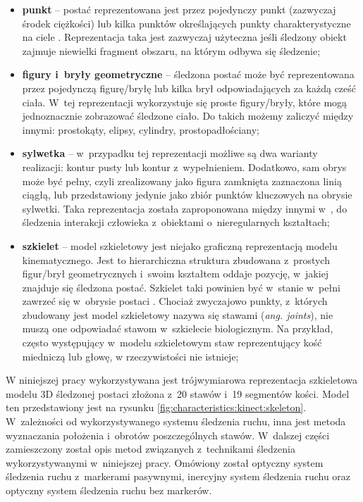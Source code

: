 \begin{itemize}
	\item \textbf{punkt} -- postać reprezentowana jest przez pojedynczy punkt (zazwyczaj środek ciężkości) \cite{Veenman2001} lub kilka punktów określających punkty charakterystyczne na ciele \cite{Serby2004}. Reprezentacja taka jest zazwyczaj użyteczna jeśli śledzony obiekt zajmuje niewielki fragment obszaru, na którym odbywa się śledzenie;
	\item \textbf{figury i~bryły geometryczne} -- śledzona postać może być reprezentowana przez pojedynczą figurę/bryłę \cite{Comaniciu2003} lub kilka brył odpowiadających za każdą cześć ciała. W~tej reprezentacji wykorzystuje się proste figury/bryły, które mogą jednoznacznie zobrazować śledzone ciało. Do takich możemy zaliczyć między innymi: prostokąty, elipsy, cylindry, prostopadłościany;
	\item \textbf{sylwetka} -- w~przypadku tej reprezentacji możliwe są dwa warianty realizacji: kontur pusty lub kontur z~wypełnieniem. Dodatkowo, sam obrys może być pełny, czyli zrealizowany jako figura zamknięta zaznaczona linią ciągłą, lub przedstawiony jedynie jako zbiór punktów kluczowych na obrysie sylwetki. Taka reprezentacja została zaproponowana między innymi w~\cite{Yilmaz2004}, do śledzenia interakcji człowieka z~obiektami o~nieregularnych kształtach;
	\item \textbf{szkielet} -- model szkieletowy jest niejako graficzną reprezentacją modelu kinematycznego. Jest to hierarchiczna struktura zbudowana z~prostych figur/brył geometrycznych i~swoim kształtem oddaje pozycję, w~jakiej znajduje się śledzona postać. Szkielet taki powinien być w~stanie w~pełni zawrzeć się w~obrysie postaci \cite{Ali2001}. Chociaż zwyczajowo punkty, z~których zbudowany jest model szkieletowy nazywa się stawami (\emph{ang. joints}), nie muszą one odpowiadać stawom w~szkielecie biologicznym. Na przykład, często występujący w~modelu szkieletowym staw reprezentujący kość miedniczą lub głowę, w rzeczywistości nie istnieje;
\end{itemize}
															
W niniejszej pracy wykorzystywana jest trójwymiarowa reprezentacja szkieletowa modelu 3D śledzonej postaci złożona z~20 stawów i~19 segmentów kości. Model ten przedstawiony jest na rysunku \ref{fig:characteristics:kinect:skeleton}. W~zależności od wykorzystywanego systemu śledzenia ruchu, inna jest metoda wyznaczania położenia i~obrotów poszczególnych stawów. W~dalszej części zamieszczony został opis metod związanych z~technikami śledzenia wykorzystywanymi w~niniejszej pracy. Omówiony został optyczny system śledzenia ruchu z~markerami pasywnymi, inercyjny system śledzenia ruchu oraz optyczny system śledzenia ruchu bez markerów.

